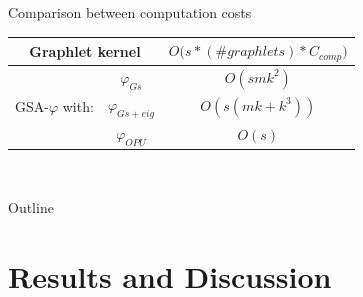 \documentclass{beamer}
\begin{document}
\begin{frame}{Comparison between computation costs}
\begin{table}
	\centering
	\begin{tabular}{|c|c|c|}
		\hline
		\multicolumn{2}{|c|}{Graphlet kernel} & $O\big(s* (\#graphlets)*C_{comp}\big)$\\ \hline \hline
		\multirow{3}{*}{GSA-$\varphi$ with:} & 
		 $\varphi_{Gs}$ & $O(s m k^2)$ \\ 
		& $\varphi_{Gs+eig}$  & $O(s (m k + k^3))$ \\ 
		& $\varphi_{OPU}$  & $O( s)$ \\ \hline
	\end{tabular}
	\label{tab:cost}
	~\vspace{-0.8cm}
\end{table}%
\end{frame}

\begin{frame}{Outline}
\tiny
\tableofcontents
\end{frame}



\section{Results and Discussion}

%
%	
\end{document}
